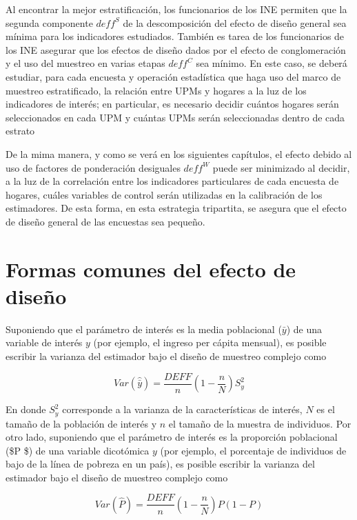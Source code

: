 \documentclass[
  10pt,
  spanish,
]{book}
\begin{document}
Al encontrar la mejor estratificación, los funcionarios de los INE permiten que la segunda componente \(deff^S\) de la descomposición del efecto de diseño general sea mínima para los indicadores estudiados. También es tarea de los funcionarios de los INE asegurar que los efectos de diseño dados por el efecto de conglomeración y el uso del muestreo en varias etapas \(deff^C\) sea mínimo. En este caso, se deberá estudiar, para cada encuesta y operación estadística que haga uso del marco de muestreo estratificado, la relación entre UPMs y hogares a la luz de los indicadores de interés; en particular, es necesario decidir cuántos hogares serán seleccionados en cada UPM y cuántas UPMs serán seleccionadas dentro de cada estrato

De la mima manera, y como se verá en los siguientes capítulos, el efecto debido al uso de factores de ponderación desiguales \(deff^W\) puede ser minimizado al decidir, a la luz de la correlación entre los indicadores particulares de cada encuesta de hogares, cuáles variables de control serán utilizadas en la calibración de los estimadores. De esta forma, en esta estrategia tripartita, se asegura que el efecto de diseño general de las encuestas sea pequeño.

\hypertarget{formas-comunes-del-efecto-de-diseuxf1o}{%
\section{Formas comunes del efecto de diseño}\label{formas-comunes-del-efecto-de-diseuxf1o}}

Suponiendo que el parámetro de interés es la media poblacional (\(\bar{y}\)) de una variable de interés \(y\) (por ejemplo, el ingreso per cápita mensual), es posible escribir la varianza del estimador bajo el diseño de muestreo complejo como

\[
Var(\hat{\bar{y}}) = \frac{DEFF}{n}\left(1-\frac{n}{N}\right)S^2_{y}
\]

En donde \(S^2_{y}\) corresponde a la varianza de la características de interés, \(N\) es el tamaño de la población de interés y \(n\) el tamaño de la muestra de individuos. Por otro lado, suponiendo que el parámetro de interés es la proporción poblacional (\$P \$) de una variable dicotómica \(y\) (por ejemplo, el porcentaje de individuos de bajo de la línea de pobreza en un país), es posible escribir la varianza del estimador bajo el diseño de muestreo complejo como

\[
Var(\hat P) = \frac{DEFF}{n}\left(1-\frac{n}{N}\right)P(1-P)
\]
\end{document}
